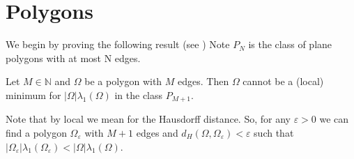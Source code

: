 \section{Polygons}
We begin by proving the following result (see \cite{henrot})
Note $P_{N}$ is the class of plane polygons with at most N edges.
\begin{theorem} \label{egm}
  Let $M \in \mathbb{N}$ and $\Omega$ be a polygon with $M$ edges.
  Then $\Omega$ cannot be a (local) minimum for $|\Omega| \lambda_{1}(\Omega)$ in the class $P_{M+1}$.
\end{theorem}
Note that by local we mean for the Hausdorff distance.
So, for any $\varepsilon > 0$ we can find a polygon $\Omega_{\varepsilon}$ with $M+1$ edges and $d_{H}(\Omega,\Omega_{\varepsilon}) < \varepsilon$ such that $| \Omega_{\varepsilon} |\lambda_{1}(\Omega_{\varepsilon}) <  | \Omega |\lambda_{1}(\Omega)$.
